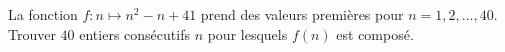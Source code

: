 La fonction $f : n \mapsto n^2 - n + 41$ prend des valeurs premières pour $n = 1, 2, \ldots, 40$. Trouver $40$ entiers consécutifs $n$ pour lesquels $f(n)$ est composé.
